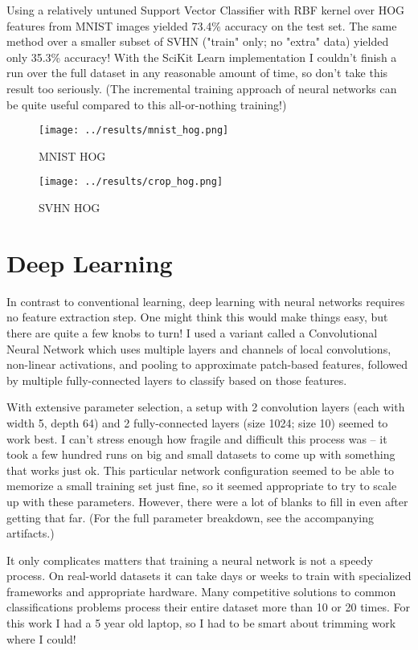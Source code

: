 \documentclass{article}
\begin{document}
Using a relatively untuned Support Vector Classifier with RBF kernel over HOG features from MNIST images yielded 73.4\% accuracy on the test set. The same method over a smaller subset of SVHN ("train" only; no "extra" data) yielded only 35.3\% accuracy! With the SciKit Learn implementation I couldn't finish a run over the full dataset in any reasonable amount of time, so don't take this result too seriously. (The incremental training approach of neural networks can be quite useful compared to this all-or-nothing training!)

\begin{figure}[htbp]
  \centering
  \texttt{[image: ../results/mnist\_hog.png]}
  \caption{MNIST HOG}
  \label{fig:mnist_hog}
\end{figure}

\begin{figure}[htbp]
  \centering
  \texttt{[image: ../results/crop\_hog.png]}
  \caption{SVHN HOG}
  \label{fig:svhn_hog}
\end{figure}

\section{Deep Learning}

In contrast to conventional learning, deep learning with neural networks requires no feature extraction step. One might think this would make things easy, but there are quite a few knobs to turn! I used a variant called a Convolutional Neural Network which uses multiple layers and channels of local convolutions, non-linear activations, and pooling to approximate patch-based features, followed by multiple fully-connected layers to classify based on those features.

With extensive parameter selection, a setup with 2 convolution layers (each with width 5, depth 64) and 2 fully-connected layers (size 1024; size 10) seemed to work best. I can't stress enough how fragile and difficult this process was -- it took a few hundred runs on big and small datasets to come up with something that works just ok. This particular network configuration seemed to be able to memorize a small training set just fine, so it seemed appropriate to try to scale up with these parameters. However, there were a lot of blanks to fill in even after getting that far. (For the full parameter breakdown, see the accompanying artifacts.)

It only complicates matters that training a neural network is not a speedy process. On real-world datasets it can take days or weeks to train with specialized frameworks and appropriate hardware. Many competitive solutions to common classifications problems process their entire dataset more than 10 or 20 times. For this work I had a 5 year old laptop, so I had to be smart about trimming work where I could!
\end{document}
